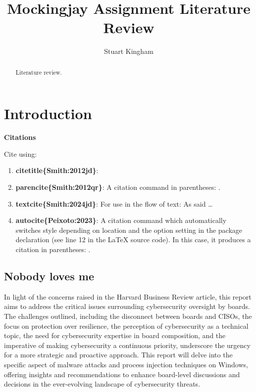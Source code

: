 \documentclass{article}
\title{Mockingjay Assignment Literature Review}
\author{Stuart Kingham}
\begin{document}
\maketitle

\begin{abstract}
Literature review.
\end{abstract}

\newpage
\tableofcontents
\listoffigures
\listoftables
{}
\newpage

\section{Introduction}

\textbf{Citations}

Cite using:
\begin{enumerate}
\item \textbf{citetitle\{Smith:2012jd\}}: 
\item \textbf{parencite\{Smith:2012qr\}}: A citation command in parentheses: \parencite{Berdajs:2010}.
\item \textbf{textcite\{Smith:2024jd\}}: For use in the flow of text: As \textcite{Berdajs:2010} said \dots
\item \textbf{autocite\{Peixoto:2023\}}: A citation command which automatically switches style depending on
  location and the option setting in the package declaration (see line 12 in the LaTeX source code). In this
  case, it produces a citation in parentheses: \autocite{Peixoto:2023}.
\end{enumerate}


\subsection{Nobody loves me}

In light of the concerns raised in the Harvard Business Review article, this report aims to address the critical issues surrounding cybersecurity oversight by boards. The challenges outlined, including the disconnect between boards and CISOs, the focus on protection over resilience, the perception of cybersecurity as a technical topic, the need for cybersecurity expertise in board composition, and the imperative of making cybersecurity a continuous priority, underscore the urgency for a more strategic and proactive approach. This report will delve into the specific aspect of malware attacks and process injection techniques on Windows, offering insights and recommendations to enhance board-level discussions and decisions in the ever-evolving landscape of cybersecurity threats.
\end{document}
